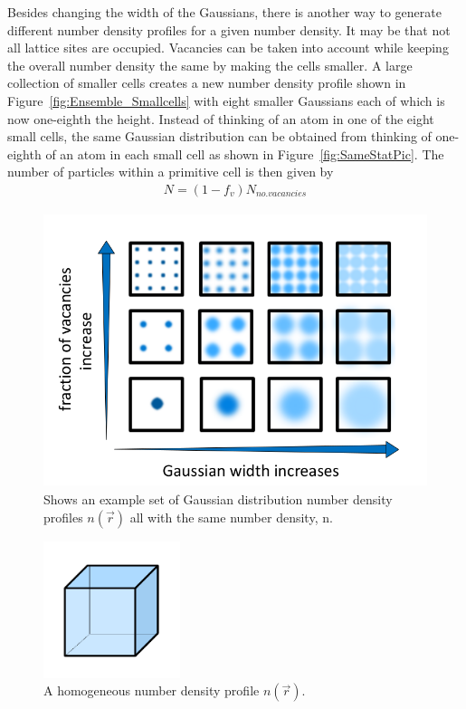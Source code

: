\documentclass[double,12pt]{beavtex}
\begin{document}
Besides changing the width of the Gaussians, there is another way to 
generate different number density profiles for a given number density.
It may be that not all lattice sites are occupied. Vacancies can be taken 
into account while keeping the overall number density the same by 
making the cells smaller. A large collection of smaller cells creates a 
new number density profile shown in Figure~\ref{fig:Ensemble_Smallcells} 
with eight smaller Gaussians each of which is now one-eighth the height. 
Instead of thinking of an atom in one of the eight small cells, the same 
Gaussian distribution can be obtained from thinking of one-eighth of an 
atom in each small cell as shown in Figure~\ref{fig:SameStatPic}.  
The number of particles within a primitive cell is then given by  
\begin{align}
    N= (1-f_v){N_{no.vacancies}}
\end{align} 

\begin{figure}
   \centering
   \includegraphics[height=8cm]{VaryWidthandVacancies.png}
   \caption{Shows an example set of Gaussian distribution number density 
   profiles $n(\vec r)$ all with the same number density, n.}
   \label{fig:Ensemble_vary}
\end{figure}  
  
\begin{figure}
   \centering
   \includegraphics[height=4cm]{figs/homogeneous_bold-box.pdf}
   \caption{A homogeneous number density profile $n(\vec{r})$.}
   \label{fig:homogen_denisty}
\end{figure} 
\end{document}
